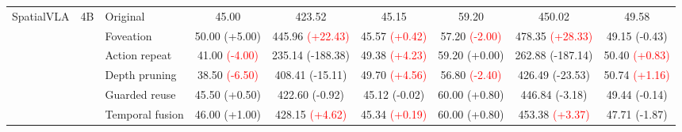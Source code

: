 \begin{table}[t]
\begin{tabular}{cclcccccc}
\multirow[c]{6}{*}{SpatialVLA}
& \multirow[c]{6}{*}{4B}
& Original & 45.00 & 423.52 & 45.15 & 59.20 & 450.02 & 49.58 \\
& & Foveation & 50.00 {\scriptsize\textcolor{green!50!black}{(+5.00)}} & 445.96 {\scriptsize\textcolor{red}{(+22.43)}} & 45.57 {\scriptsize\textcolor{red}{(+0.42)}} & 57.20 {\scriptsize\textcolor{red}{(-2.00)}} & 478.35 {\scriptsize\textcolor{red}{(+28.33)}} & 49.15 {\scriptsize\textcolor{green!50!black}{(-0.43)}} \\
& & Action repeat & 41.00 {\scriptsize\textcolor{red}{(-4.00)}} & 235.14 {\scriptsize\textcolor{green!50!black}{(-188.38)}} & 49.38 {\scriptsize\textcolor{red}{(+4.23)}} & 59.20 {\scriptsize\textcolor{green!50!black}{(+0.00)}} & 262.88 {\scriptsize\textcolor{green!50!black}{(-187.14)}} & 50.40 {\scriptsize\textcolor{red}{(+0.83)}} \\
& & Depth pruning & 38.50 {\scriptsize\textcolor{red}{(-6.50)}} & 408.41 {\scriptsize\textcolor{green!50!black}{(-15.11)}} & 49.70 {\scriptsize\textcolor{red}{(+4.56)}} & 56.80 {\scriptsize\textcolor{red}{(-2.40)}} & 426.49 {\scriptsize\textcolor{green!50!black}{(-23.53)}} & 50.74 {\scriptsize\textcolor{red}{(+1.16)}} \\
& & Guarded reuse & 45.50 {\scriptsize\textcolor{green!50!black}{(+0.50)}} & 422.60 {\scriptsize\textcolor{green!50!black}{(-0.92)}} & 45.12 {\scriptsize\textcolor{green!50!black}{(-0.02)}} & 60.00 {\scriptsize\textcolor{green!50!black}{(+0.80)}} & 446.84 {\scriptsize\textcolor{green!50!black}{(-3.18)}} & 49.44 {\scriptsize\textcolor{green!50!black}{(-0.14)}} \\
& & Temporal fusion & 46.00 {\scriptsize\textcolor{green!50!black}{(+1.00)}} & 428.15 {\scriptsize\textcolor{red}{(+4.62)}} & 45.34 {\scriptsize\textcolor{red}{(+0.19)}} & 60.00 {\scriptsize\textcolor{green!50!black}{(+0.80)}} & 453.38 {\scriptsize\textcolor{red}{(+3.37)}} & 47.71 {\scriptsize\textcolor{green!50!black}{(-1.87)}} \\
\cmidrule(lr){1-9}


\end{tabular}
\end{table}
